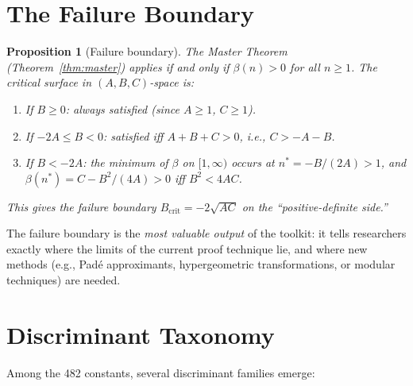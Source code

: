 \documentclass[11pt,a4paper]{article}
\newtheorem{proposition}[theorem]{Proposition}
\theoremstyle{definition}
\theoremstyle{remark}
\begin{document}
\section{The Failure Boundary}\label{sec:boundary}

\begin{proposition}[Failure boundary]\label{prop:boundary}
The Master Theorem (Theorem~\ref{thm:master}) applies if and only if
$\beta(n) > 0$ for all $n \ge 1$.  The critical surface in
$(A,B,C)$-space is:
\begin{enumerate}
  \item If $B \ge 0$: always satisfied (since $A \ge 1$, $C \ge 1$).
  \item If $-2A \le B < 0$: satisfied iff $A + B + C > 0$,
    i.e., $C > -A - B$.
  \item If $B < -2A$: the minimum of $\beta$ on $[1,\infty)$ occurs at
    $n^* = -B/(2A) > 1$, and $\beta(n^*) = C - B^2/(4A) > 0$ iff
    $B^2 < 4AC$.
\end{enumerate}
This gives the failure boundary
$B_{\mathrm{crit}} = -2\sqrt{AC}$ on the ``positive-definite side.''
\end{proposition}

The failure boundary is the \emph{most valuable output} of the toolkit:
it tells researchers exactly where the limits of the current proof
technique lie, and where new methods (e.g., Pad\'{e} approximants,
hypergeometric transformations, or modular techniques) are needed.


\section{Discriminant Taxonomy}\label{sec:taxonomy}

Among the 482 constants, several discriminant families emerge:
\end{document}
